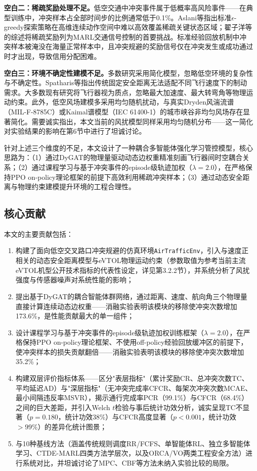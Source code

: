 \documentclass[12pt,a4paper,UTF8]{ctexart}
\begin{document}
\textbf{空白二：稀疏奖励处理不足。}低空交通中冲突事件属于低概率高风险事件——在典型训练中，冲突样本占全部时间步的比例通常低于0.1\%。Aslani等指出标准$\epsilon$-greedy探索策略在高维连续动作空间中难以高效覆盖稀疏关键状态区域\cite{ref10}；翟子洋等的综述将稀疏奖励列为MARL交通信号控制的首要挑战\cite{ref11}。标准经验回放机制中冲突样本被淹没在海量正常样本中，且冲突规避的奖励信号仅在冲突发生或成功通过时才出现，导致信用分配困难。

\textbf{空白三：环境不确定性建模不足。}多数研究采用简化模型，忽略低空环境的复杂性与不确定性。Spatharis等指出传统固定安全距离无法适配不同飞行速度下的制动需求\cite{ref7}。大多数现有研究将飞行器视为质点，忽略最大加速度、最大转弯角等物理运动约束。此外，低空风场建模多采用均匀随机扰动，与真实Dryden风湍流谱（MIL-F-8785C）\cite{ref20}或Kaimal谱模型（IEC 61400-1）的城市峡谷非均匀风场存在显著简化。需要诚实指出，本文当前的风扰模型同样采用均匀随机分布——这一简化对实验结果的影响在第6节中进行了坦诚讨论。

针对上述三个维度的不足，本文设计了一种耦合多智能体强化学习管控模型，核心思路为：（1）通过DyGAT的物理量驱动动态边权重精准刻画飞行器间时空耦合关系；（2）通过课程学习与基于冲突事件的episode级轨迹加权（$\lambda=2.0$），在严格保持PPO on-policy理论框架的前提下高效利用稀疏冲突样本；（3）通过动态安全距离与物理约束建模提升环境的工程合理性。

\subsection{核心贡献}

本文的主要贡献包括：

\begin{enumerate}[label=(\arabic*)]
    \item 构建了面向低空交叉路口冲突规避的仿真环境\texttt{AirTrafficEnv}，引入与速度正相关的动态安全距离模型与eVTOL物理运动约束（参数取值为参考当前主流eVTOL机型公开技术指标的代表性设定，详见第3.2.2节），并系统分析了风扰强度与传感器噪声对系统性能的影响；
    \item 提出基于DyGAT的耦合智能体群网络，通过距离、速度、航向角三个物理量直接计算连续动态边权重——消融实验表明该模块的移除使冲突次数增加173.6\%，是性能贡献最大的单一组件；
    \item 设计课程学习与基于冲突事件的episode级轨迹加权训练框架（$\lambda=2.0$），在严格保持PPO on-policy理论框架、不使用off-policy经验回放缓冲区的前提下，使冲突样本的损失贡献翻倍——消融实验表明该模块的移除使冲突次数增加35.2\%；
    \item 构建双层评价指标体系——区分"表层指标"（累计奖励CR、总冲突次数TC、平均延迟AD）与"深层指标"（无冲突完成率CFCR、每架次冲突次数MCAE、最小间隔违反率MSVR），揭示通行完成率PCR（99.1\%）与CFCR（68.4\%）之间的巨大差距，并引入Welch $t$检验与事后统计功效分析，诚实呈现TC不显著（$p=0.180$，统计功效38\%）与CFCR高度显著（$p<0.001$，统计功效$>99\%$）的差异化统计图景；
    \item 与10种基线方法（涵盖传统规则调度RR/FCFS、单智能体RL、独立多智能体学习、CTDE-MARL四类方法学层次，以及ORCA/VO两类工程安全方法）进行系统对比，并坦诚讨论了MPC、CBF等方法未纳入实验比较的局限。
\end{enumerate}
\end{document}
